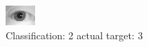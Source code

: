\begin{figure}[h!]
\begin{center}
\includegraphics[width=0.60\columnwidth]{figures/ID1188_class_2_target_3.png}
\end{center}
\caption{ Classification: 2 actual target: 3}
\label{fig:ID1188_class_2_target_3}
\end{figure}
